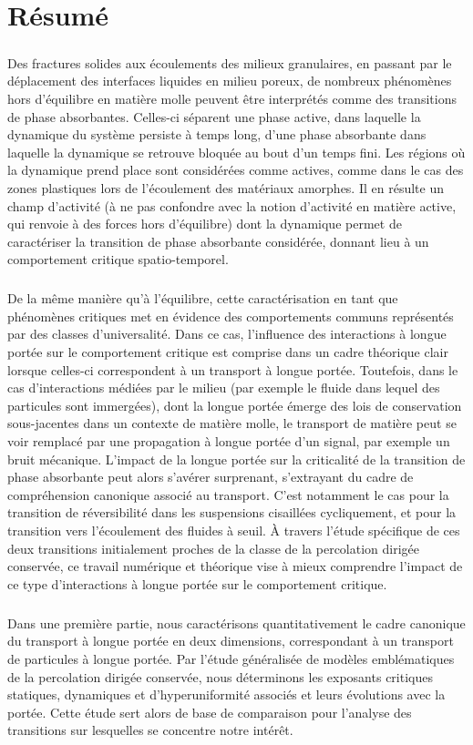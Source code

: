 \section*{Résumé}

\subparagraph{}Des fractures solides aux écoulements des milieux granulaires, en passant par le déplacement des interfaces liquides en milieu poreux, de nombreux phénomènes hors d’équilibre en matière molle peuvent être interprétés comme des transitions de phase absorbantes. Celles-ci séparent une phase active, dans laquelle la dynamique du système persiste à temps long, d'une phase absorbante dans laquelle la dynamique se retrouve bloquée au bout d’un temps fini. Les régions où la dynamique prend place sont considérées comme actives, comme dans le cas des zones plastiques lors de l'écoulement des matériaux amorphes. Il en résulte un champ d’activité (à ne pas confondre avec la notion d’activité en matière active, qui renvoie à des forces hors d’équilibre) dont la dynamique permet de caractériser la transition de phase absorbante considérée, donnant lieu à un comportement critique spatio-temporel.

\subparagraph{}De la même manière qu'à l'équilibre, cette caractérisation en tant que phénomènes critiques met en évidence des comportements communs représentés par des classes d'universalité. Dans ce cas, l'influence des interactions à longue portée sur le comportement critique est comprise dans un cadre théorique clair lorsque celles-ci correspondent à un transport à longue portée. Toutefois, dans le cas d'interactions médiées par le milieu (par exemple le fluide dans lequel des particules sont immergées), dont la longue portée émerge des lois de conservation sous-jacentes dans un contexte de matière molle, le transport de matière peut se voir remplacé par une propagation à longue portée d’un signal, par exemple un bruit mécanique. L'impact de la longue portée sur la criticalité de la transition de phase absorbante peut alors s'avérer surprenant, s'extrayant du cadre de compréhension canonique associé au transport. C'est notamment le cas pour la transition de réversibilité dans les suspensions cisaillées cycliquement, et pour la transition vers l'écoulement des fluides à seuil. \`A travers l'étude spécifique de ces deux transitions initialement proches de la classe de la percolation dirigée conservée, ce travail numérique et théorique vise à mieux comprendre l'impact de ce type d'interactions à longue portée sur le comportement critique.

\subparagraph{}Dans une première partie, nous caractérisons quantitativement le cadre canonique du transport à longue portée en deux dimensions, correspondant à un transport de particules à longue portée. Par l'étude généralisée de modèles emblématiques de la percolation dirigée conservée, nous déterminons les exposants critiques statiques, dynamiques et d'hyperuniformité associés et leurs évolutions avec la portée. Cette étude sert alors de base de comparaison pour l'analyse des transitions sur lesquelles se concentre notre intérêt.

